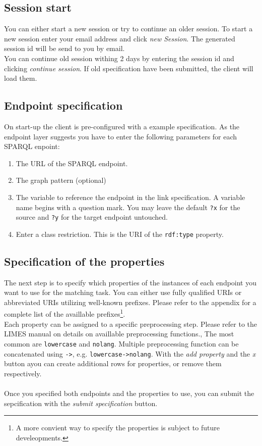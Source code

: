 \documentclass{article}
\begin{document}
\subsection{Session start}
You can either start a new session or try to continue an older session. To start a new session enter your email address and click \textit{new Session}. The generated session id will be send to you by email.\\ You can continue old session withing 2 days by entering the session id and clicking \textit{continue session}. If old specification have been submitted, the client will load them.
\subsection{Endpoint specification}
On start-up the client is pre-configured with a example specification. As the endpoint layer suggests you have to enter the following parameters for each SPARQL enpoint:

\begin{enumerate}
	\item The URL of the SPARQL endpoint.
	\item The graph pattern (optional)
	\item The variable to reference the endpoint in the link specification. A variable name begins with a question mark. You may leave the default \texttt{?x} for the source and \texttt{?y} for the target endpoint untouched.
	\item Enter a class restriction. This is the URI of the \texttt{rdf:type} property.
\end{enumerate}

\subsection{Specification of the properties}
The next step is to specify which properties of the instances of each endpoint you want to use for the matching task. You can either use fully qualified URIs or abbreviated URIs utilizing well-known prefixes. Please refer to the appendix for a complete list of the availlable prefixes\footnote{A more convient way to specify the properties is subject to future develeopments.}.\\Each property can be assigned to a specific preprocessing step. Please refer to the LIMES manual on details on availlable preprocessing functions., The most common are \texttt{lowercase} and \texttt{nolang}. Multiple preprocessing function can be concatenated using \texttt{->}, e.g. \texttt{lowercase->nolang}. With the \textit{add property} and the \textit{x} button ayou can create additional rows for properties, or remove them respectively.\\ \\
Once you specified both endpoints and the properties to use, you can submit the sepcification with the \textit{submit specification}  button.
\end{document}
